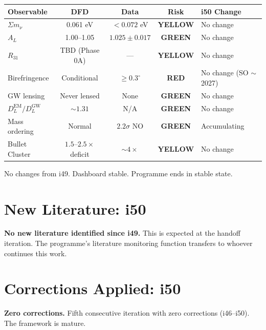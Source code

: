 \documentclass[11pt,a4paper]{article}
\newcommand{\GREEN}{\textcolor{dfdgreen}{\textbf{GREEN}}}
\newcommand{\YELLOW}{\textcolor{dfdyellow}{\textbf{YELLOW}}}
\newcommand{\RED}{\textcolor{dfdred}{\textbf{RED}}}
\begin{document}
\begin{center}
\begin{longtable}{lcccl}
\toprule
\textbf{Observable} & \textbf{DFD} & \textbf{Data} & \textbf{Risk} & \textbf{i50 Change} \\
\midrule
\endfirsthead
$\Sigma m_\nu$ & 0.061 eV & $< 0.072$ eV & \YELLOW & No change \\
$A_L$ & 1.00--1.05 & $1.025 \pm 0.017$ & \GREEN & No change \\
$R_{31}$ & TBD (Phase 0A) & --- & \YELLOW & No change \\
Birefringence & Conditional & $\geq 0.3^\circ$ & \RED & No change (SO $\sim$2027) \\
GW lensing & Never lensed & None & \GREEN & No change \\
$D_L^\text{EM}/D_L^\text{GW}$ & $\sim 1.31$ & N/A & \GREEN & No change \\
Mass ordering & Normal & $2.2\sigma$ NO & \GREEN & Accumulating \\
Bullet Cluster & $1.5$--$2.5\times$ deficit & $\sim 4\times$ & \YELLOW & No change \\
\bottomrule
\end{longtable}
\end{center}

No changes from i49. Dashboard stable. Programme ends in stable state.


\part{New Literature: i50}

\textbf{No new literature identified since i49.} This is expected at the handoff iteration. The programme's literature monitoring function transfers to whoever continues this work.


\part{Corrections Applied: i50}

\textbf{Zero corrections.} Fifth consecutive iteration with zero corrections (i46--i50). The framework is mature.


\end{document}
